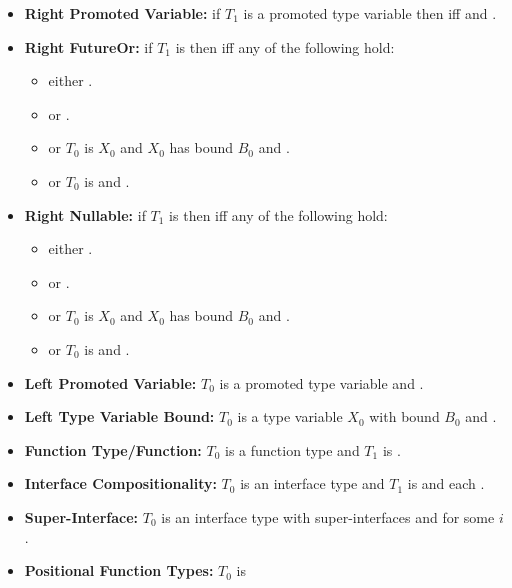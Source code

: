 \documentclass[makeidx]{article}
\begin{document}
\begin{itemize}
\item
  \textbf{Right Promoted Variable:}
  if $T_1$ is a promoted type variable 
  then  if{}f  and .
\item
  \textbf{Right FutureOr:}
  if $T_1$ is 
  then  if{}f any of the following hold:
  \begin{itemize}
  \item either .
  \item or .
  \item or $T_0$ is $X_0$ and $X_0$ has bound $B_0$ and .
  \item or $T_0$ is  and .
  \end{itemize}
\item
  \textbf{Right Nullable:}
  if $T_1$ is 
  then  if{}f any of the following hold:
  \begin{itemize}
  \item either .
  \item or .
  \item or $T_0$ is $X_0$ and $X_0$ has bound $B_0$ and .
  \item or $T_0$ is  and .
  \end{itemize}
\item
  \textbf{Left Promoted Variable:}
  $T_0$ is a promoted type variable 
  and .
\item
  \textbf{Left Type Variable Bound:}
  $T_0$ is a type variable $X_0$ with bound $B_0$
  and .
\item
  \textbf{Function Type/Function:}
  $T_0$ is a function type and $T_1$ is \FUNCTION.
\item
  \textbf{Interface Compositionality:}
  $T_0$ is an interface type 
  and $T_1$ is  and each .
\item
  \textbf{Super-Interface:}
  $T_0$ is an interface type with super-interfaces 
  and  for some $i$.
\item
  \textbf{Positional Function Types:}
  $T_0$ is


\end{itemize}
\end{document}
